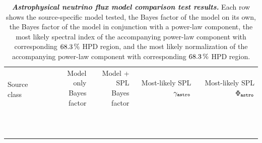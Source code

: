 \begin{table}
	\centering
	\begin{minipage}{\linewidth}
		\begin{tabular}{l l r r r r}
			\toprule
			\multirow{2}{*}{\makecell[l]{}Source class} & \multirow{2}{*}{\makecell[l]{Model}} & \multirowcell{2}{Model only \\ Bayes factor} & \multirowcell{2}{Model + SPL \\ Bayes factor} & \multirowcell{2}{Most-likely \\ SPL $\gamma_\texttt{astro}$} & \multirowcell{2}{Most-likely \\ SPL $\Phi_\texttt{astro}$} \\
			& & & & & \\ \midrule
			\SteckerTableSummary \\ \midrule
			\FangTableSummary \\ \midrule
			\KimuraBOneTableSummary \\ \midrule
			\KimuraBFourTableSummary \\ \midrule
			\KimuraTwoCompTableSummary \\ \midrule
			\MariaBLLacsTableSummary \\ \midrule
			\MurasechockedJetsTableSummary \\ \midrule
			\SBGminBmodelTableSummary \\ \midrule
			\TavecchilowPowerTableSummary \\ \midrule
			\TDEWinterBiehlTableSummary \\ \midrule
			\bottomrule
		\end{tabular}
	\end{minipage}
	\begin{minipage}{\linewidth}
		\internallinenumbers
		\caption{\textbf{\textit{Astrophysical neutrino flux model comparison test results.}} Each row shows the source-specific model tested, the Bayes factor of the model on its own, the Bayes factor of the model in conjunction with a power-law component, the most likely spectral index of the accompanying power-law component with corresponding $\SI{68.3}\percent$ HPD region, and the most likely normalization of the accompanying power-law component with corresponding $\SI{68.3}\percent$ HPD region.} \vspace{-6mm}\label{tbl:diffuse_models}
	\end{minipage}
\end{table}

